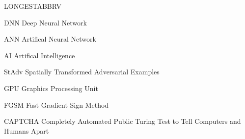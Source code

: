 \begin{theglossary}{LONGESTABBRV}

    \item[DNN] Deep Neural Network
    \item[ANN] Artifical Neural Network
    \item[AI] Artifical Intelligence
    \item[StAdv] Spatially Transformed Adversarial Examples
    \item[GPU] Graphics Processing Unit
    \item[FGSM] Fast Gradient Sign Method
    \item[CAPTCHA] Completely Automated Public Turing Test to Tell Computers and Humans Apart


\end{theglossary}
